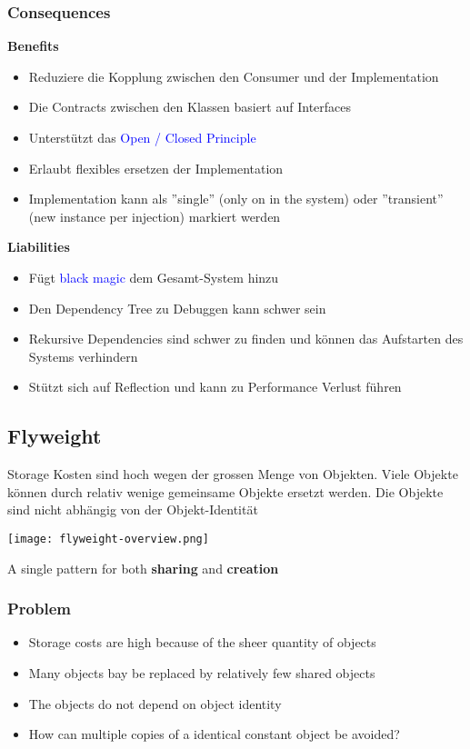 \subsubsection{Consequences}
\textbf{Benefits}
\begin{itemize}
    \item Reduziere die Kopplung zwischen den Consumer und der Implementation
    \item Die Contracts zwischen den Klassen basiert auf Interfaces
    \item Unterstützt das \textcolor{blue}{Open / Closed Principle}
    \item Erlaubt flexibles ersetzen der Implementation
    \item Implementation kann als ''single'' (only on in the system) oder ''transient'' (new instance per injection) markiert werden
\end{itemize}
\vspace{10pt}
\textbf{Liabilities}
\begin{itemize}
    \item Fügt \textcolor{blue}{black magic} dem Gesamt-System hinzu
    \item Den Dependency Tree zu Debuggen kann schwer sein
    \item Rekursive Dependencies sind schwer zu finden und können das Aufstarten des Systems verhindern
    \item Stützt sich auf Reflection und kann zu Performance Verlust führen
\end{itemize}

\subsection{Flyweight}

Storage Kosten sind hoch wegen der grossen Menge von Objekten. Viele Objekte können durch relativ wenige gemeinsame Objekte ersetzt werden. Die Objekte sind nicht abhängig von der Objekt-Identität

\texttt{[image: flyweight-overview.png]}

A single pattern for both \textbf{sharing} and \textbf{creation}
\subsubsection{Problem}
\begin{itemize}
    \item Storage costs are high because of the sheer quantity of objects
    \item Many objects bay be replaced by relatively few shared objects
    \item The objects do not depend on object identity
    \item How can multiple copies of a identical constant object be avoided?
\end{itemize}

